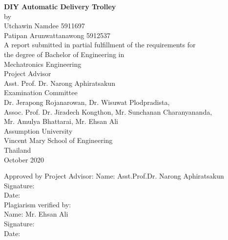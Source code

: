 \documentclass[12pt]{article}
\begin{document}
\begin{titlepage}
	\begin{center}
		
		\LARGE{\bfseries DIY Automatic Delivery Trolley} \\
		[1cm]
		\normalsize by \\
		[1cm]
		Utchawin Namdee 5911697 \\
		Patipan Arunwattanawong 5912537 \\
		[1cm]
		A report submitted in partial fulfillment of the requirements for \\
		the degree of Bachelor of Engineering in \\
		Mechatronics Engineering \\
		[1cm]
		Project Advisor\\
		Asst. Prof. Dr. Narong Aphiratsakun \\
		[1cm]
		Examination Committee \\
		[1cm]
		Dr. Jerapong Rojanarowan, Dr. Wisuwat Plodpradista, \\
		Assoc. Prof. Dr. Jiradech Kongthon, Mr. Sunchanan Charanyananda, \\
		Mr. Amulya Bhattarai, Mr. Ehsan Ali \\
		[1cm]
		Assumption University \\
		Vincent Mary School of Engineering\\
		Thailand \\
		October 2020 \\
		
	\end{center}
\end{titlepage}

\newpage
\thispagestyle{empty}

\noindent Approved by Project Advisor:\newline
\hspace*{7cm} Name: Asst.Prof.Dr. Narong Aphiratsakun \\
\hspace*{7cm} Signature:\\
\hspace*{7cm} Date:\hrulefill \\
[1cm]
Plagiarism verified by: \\
\hspace*{7cm} Name: Mr. Ehsan Ali \\
\hspace*{7cm} Signature: \\
\hspace*{7cm} Date:\hrulefill \\
\end{document}
